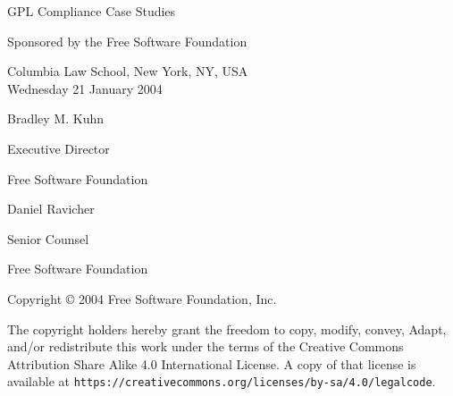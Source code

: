 \documentclass[12pt]{report}
\begin{document}
\begin{titlepage}


\begin{center}

\vspace{.5in}

{\Large {\sc GPL Compliance Case Studies} \\

\vspace{.7in}

Sponsored by the Free Software Foundation \\


\vspace{.3in}

Columbia Law School, New York, NY, USA \\
\vspace{.1in}
Wednesday 21 January 2004
}

\vspace{.7in}

{\large
Bradley M. Kuhn

Executive Director

Free Software Foundation
}

\vspace{.3in}


{\large
Daniel Ravicher

Senior Counsel 

Free Software Foundation
}

\end{center}

\vfill

{\parindent 0in
Copyright \copyright{} 2004 \hspace{.2in} Free Software Foundation, Inc.

\vspace{.3in}

The copyright holders hereby grant the freedom to copy, modify, convey,
Adapt, and/or redistribute this work under the terms of the Creative Commons
Attribution Share Alike 4.0 International License.  A copy of that license is
available at \verb=https://creativecommons.org/licenses/by-sa/4.0/legalcode=.
}

\end{titlepage}

\pagestyle{plain}
\end{document}
